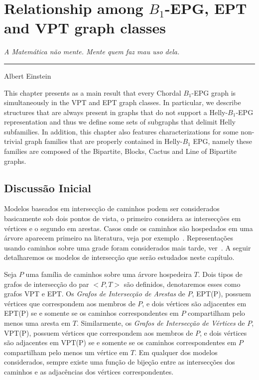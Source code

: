 \chapter{Relationship among  $B_1$-EPG, EPT and VPT graph classes}
\label{cap:v}

\begin{flushright}
\begin{minipage}[t][0cm][b]{0.47\textwidth}
\emph{
A Matemática não mente. Mente quem faz mau uso dela.}
\end{minipage}

\rule[0cm]{7cm}{0.03cm}%

Albert Einstein
\end{flushright}

This chapter presents as a main result that every Chordal $B_1$-EPG graph is simultaneously in the VPT and EPT graph classes. In particular, we describe structures that are always present in graphs that do not support a Helly-$B_1$-EPG representation and thus we define some sets of subgraphs that delimit Helly subfamilies. 
 In addition, this chapter also features characterizations for some non-trivial graph families that are properly contained in Helly-$B_1$ EPG, namely these families are composed of the Bipartite, Blocks, Cactus and Line of Bipartite  graphs.


\section{Discussão Inicial}

Modelos baseados em intersecção de caminhos podem ser considerados basicamente sob dois pontos de vista, o primeiro considera as intersecções em vértices e o segundo em arestas. Casos onde os caminhos são hospedados em uma árvore aparecem primeiro na literatura, veja por exemplo~\cite{gavril1978recognition, golumbic1985edge, golumbic1985}.  Representações usando caminhos sobre uma grade foram considerados mais tarde, ver~\cite{golumbic2009,golumbic2013, golumbic2013intersection}. A seguir detalharemos os modelos de intersecção que serão estudados neste capítulo. %

 Seja $P$ uma família de caminhos sobre uma árvore hospedeira $T$. Dois tipos de grafos de intersecção do par  $<P,T>$ são definidos, denotaremos esses como grafos VPT e EPT.
Os \textit{Grafos de Intersecção de Arestas} de $P$, EPT(P), possuem  vértices que correspondem aos membros de $P$, e dois vértices são  adjacentes em EPT(P) se e somente se os caminhos correspondentes em $P$ compartilham pelo menos uma aresta em $T$. Similarmente, os \textit{Grafos de Intersecção de Vértices} de $P$, VPT(P), possuem vértices que correspondem aos membros de  $P$, e dois vértices são adjacentes em VPT(P) se e somente se os caminhos correspondentes em  $P$ compartilham pelo menos um vértice em $T$. Em qualquer dos modelos considerados, sempre existe uma função de bijeção entre as intersecções dos caminhos e as adjacências dos vértices correspondentes. 


